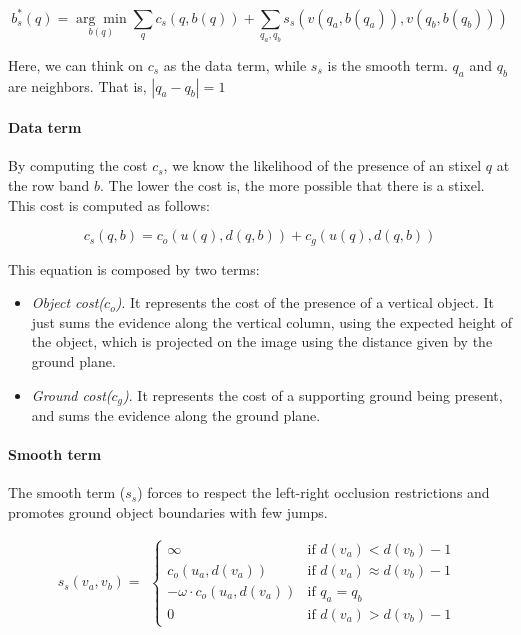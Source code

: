 \begin{equation}\label{eq:cp04_stixel_band_cost}
  b^*_s (q) = \underset{b(q)}{\arg\min} \underset{q}{\sum}c_s(q, b(q)) + \underset{q_a, q_b}{\sum}s_s(v(q_a, b(q_a)), v(q_b, b(q_b)))
\end{equation}

Here, we can think on $c_s$ as the data term, while $s_s$ is the smooth term. $q_a$ and $q_b$ are neighbors. That is, $|q_a - q_b| = 1$

\paragraph{Data term}\label{ch:chapter04_01_02_01}

By computing the cost $c_s$, we know the likelihood of the presence of an stixel $q$ at the row band $b$. The lower the cost is, the more possible that there is a stixel. This cost is computed as follows:

\begin{equation}\label{eq:cp04_stixel_band_cost_data_term}
  c_s(q, b) = c_o (u(q), d(q, b)) + c_g(u(q), d(q,b))
\end{equation}

This equation is composed by two terms:
\begin{itemize}
 \item \emph{Object cost($c_o$)}. It represents the cost of the presence of a vertical object. It just sums the evidence along the vertical column, using the expected height of the object, which is projected on the image using the distance given by the ground plane.
 \item \emph{Ground cost($c_g$)}. It represents the cost of a supporting ground being present, and sums the evidence along the ground plane.
\end{itemize}

\paragraph{Smooth term}\label{ch:chapter04_01_02_02}

The smooth term ($s_s$) forces to respect the left-right occlusion restrictions and promotes ground object boundaries with few jumps.

\begin{equation}\label{eq:cp04_stixel_band_cost_smooth_term}
  s_s(v_a, v_b) = 
  \begin{align*}
    \begin{cases}
    \infty & \text{if } d(v_a) < d(v_b) - 1 \\
    c_o(u_a, d(v_a)) & \text{if } d(v_a) \approx d(v_b) - 1 \\
    - \omega \cdot c_o(u_a, d(v_a)) & \text{if } q_a = q_b \\
    0 & \text{if } d(v_a) > d(v_b) - 1
    \end{cases}
  \end{align*}
\end{equation}

